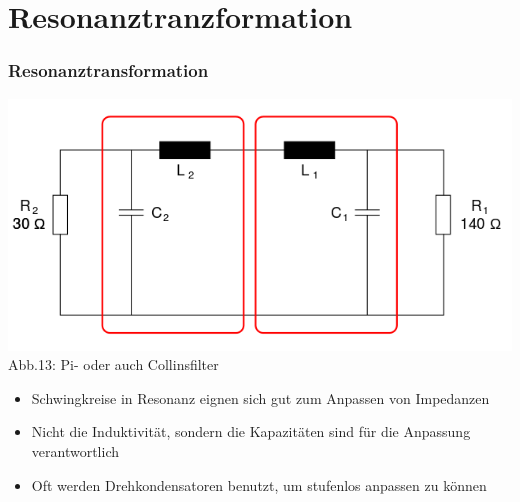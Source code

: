 \section*{Resonanztranzformation}
\begin{frame}
\frametitle{Resonanztransformation}
\begin{center}
	\includegraphics[scale=0.2]{a04/Pi-Filter.png}\\
	Abb.13: Pi- oder auch Collinsfilter \cite{wpde}
\end{center}
\begin{itemize}
	\item	Schwingkreise in Resonanz eignen sich gut zum Anpassen von Impedanzen
	\item	Nicht die Induktivität, sondern die Kapazitäten sind für die Anpassung verantwortlich
	\item	Oft werden Drehkondensatoren benutzt, um stufenlos anpassen zu können
\end{itemize}
\end{frame}


